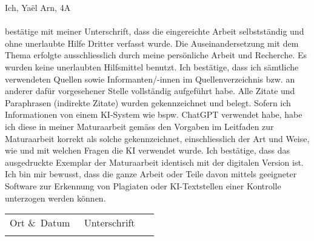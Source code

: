 Ich, Yaël Arn, 4A \\ \\
bestätige mit meiner Unterschrift, dass die eingereichte Arbeit
selbstständig und ohne unerlaubte Hilfe Dritter verfasst wurde.
Die Auseinandersetzung mit dem Thema erfolgte ausschliesslich
durch meine persönliche Arbeit und Recherche. Es wurden
keine unerlaubten Hilfsmittel benutzt.
Ich bestätige, dass ich sämtliche verwendeten Quellen sowie
Informanten/-innen im Quellenverzeichnis bzw. an anderer dafür
vorgesehener Stelle vollständig aufgeführt habe. Alle Zitate
und Paraphrasen (indirekte Zitate) wurden gekennzeichnet und
belegt. Sofern ich Informationen von einem KI-System wie
bspw. ChatGPT verwendet habe, habe ich diese in meiner Maturaarbeit
gemäss den Vorgaben im Leitfaden zur Maturaarbeit
korrekt als solche gekennzeichnet, einschliesslich der Art und
Weise, wie und mit welchen Fragen die KI verwendet wurde.
Ich bestätige, dass das ausgedruckte Exemplar der Maturaarbeit
identisch mit der digitalen Version ist.
Ich bin mir bewusst, dass die ganze Arbeit oder Teile davon
mittels geeigneter Software zur Erkennung von Plagiaten oder
KI-Textstellen einer Kontrolle unterzogen werden können.

\vspace{3cm}

\noindent
\begin{tabular}{p{0.47\linewidth}p{0.47\linewidth}}
  Ort \&\ Datum & Unterschrift \\
  & \\[1cm]
  \hline
\end{tabular}
